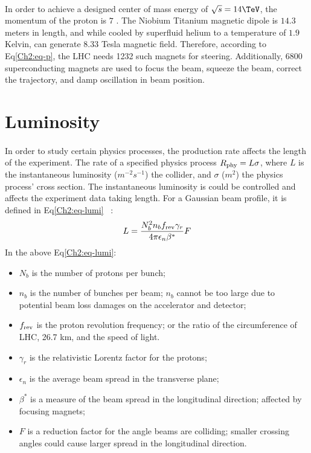 \paragraph{}
In order to achieve a designed center of mass energy of $\sqrt{s} = 14 \TeV$, the momentum of the proton is $7$ \TeV. The Niobium Titanium magnetic dipole is $14.3$ meters in length, and while cooled by superfluid helium to a temperature of $1.9$ Kelvin, can generate $8.33$ Tesla magnetic field. Therefore, according to Eq\ref{Ch2:eq-p}, the LHC needs 1232 such magnets for steering. Additionally, 6800 superconducting magnets are used to focus the beam, squeeze the beam, correct the trajectory, and damp oscillation in beam position.


\section{Luminosity}
\paragraph{}
In order to study certain physics processes, the production rate affects the length of the experiment. The rate of a specified physics process $R_{\rm phy} = L\sigma$, where $L$ is the instantaneous luminosity ($m^{-2}s^{-1}$) the collider, and $\sigma$ ($m^2$) the physics process' cross section. The instantaneous luminosity is could be controlled and affects the experiment data taking length. For a Gaussian beam profile, it is defined in Eq\ref{Ch2:eq-lumi} ~\cite{LHCReview}:
%
\begin{equation}
\label{Ch2:eq-lumi}
L = \frac{N_b^2 n_b f_{\rm rev} \gamma_r}{4\pi \epsilon_n \beta^*} F
\end{equation}
%
In the above Eq\ref{Ch2:eq-lumi}:
\begin{itemize}
	\item $N_b$ is the number of protons per bunch; 
	\item $n_b$ is the number of bunches per beam; $n_b$ cannot be too large due to potential beam loss damages on the accelerator and detector; %
	\item $f_{\rm rev}$ is the proton revolution frequency; or the ratio of the circumference of LHC, 26.7 km, and the speed of light.
	\item $\gamma_r$ is the relativistic Lorentz factor for the protons;
	\item $\epsilon_n$ is the average beam spread in the transverse plane;
	\item $\beta^*$ is a measure of the beam spread in the longitudinal direction; affected by focusing magnets;
	\item $F$ is a reduction factor for the angle beams are colliding; smaller crossing angles could cause larger spread in the longitudinal direction.
\end{itemize}

